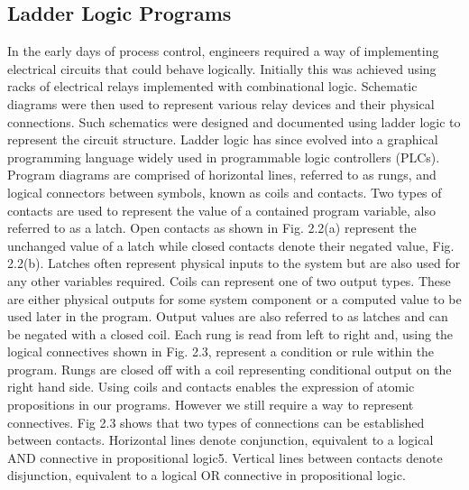 \documentclass[runningheads]{llncs}
\begin{document}
\subsection{Ladder Logic Programs}
In the early days of process control, engineers required a way of implementing electrical
circuits that could behave logically. Initially this was achieved using racks of electrical
relays implemented with combinational logic. Schematic diagrams were then used to
represent various relay devices and their physical connections. Such schematics were designed and documented using ladder logic to represent the circuit structure. Ladder logic
has since evolved into a graphical programming language widely used in programmable
logic controllers (PLCs). Program diagrams are comprised of horizontal lines, referred
to as rungs, and logical connectors between symbols, known as coils and contacts. Two
types of contacts are used to represent the value of a contained program variable, also
referred to as a latch. Open contacts as shown in Fig. 2.2(a) represent the unchanged
value of a latch while closed contacts denote their negated value, Fig. 2.2(b). Latches
often represent physical inputs to the system but are also used for any other variables
required. Coils can represent one of two output types. These are either physical outputs
for some system component or a computed value to be used later in the program. Output
values are also referred to as latches and can be negated with a closed coil. Each rung
is read from left to right and, using the logical connectives shown in Fig. 2.3, represent
a condition or rule within the program. Rungs are closed off with a coil representing
conditional output on the right hand side. Using coils and contacts enables the expression of atomic propositions in our programs.
However we still require a way to represent connectives. Fig 2.3 shows that two types of
connections can be established between contacts. Horizontal lines denote conjunction, equivalent to a logical AND connective in propositional logic5. Vertical lines between
contacts denote disjunction, equivalent to a logical OR connective in propositional logic.
\end{document}
